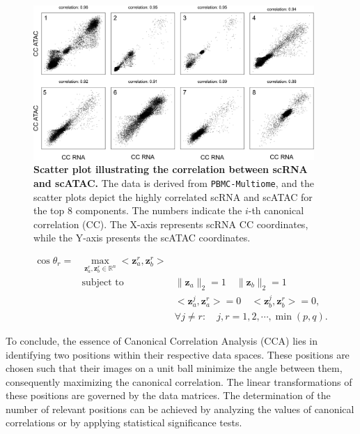 \begin{figure}[!ht]
	\centering
	\includegraphics[width=0.95\textwidth]{CC_corrlation_scatter/fig}
	\vspace{0.1cm}
	\caption[Scatter plot illustrating the correlation between scRNA and scATAC.]{\textbf{Scatter plot illustrating the correlation between scRNA and scATAC.} The data is derived from \texttt{PBMC-Multiome}, and the scatter plots depict the highly correlated scRNA and scATAC for the top 8 components. The numbers indicate the $i$-th canonical correlation (CC). The X-axis represents scRNA CC coordinates, while the Y-axis presents the scATAC coordinates.}
	\label{fig:CC_corrlation_scatter}
\end{figure}

\begin{equation}
\begin{aligned}
\cos \theta_r = &\underset{{\mathbf z}_a^r, {\mathbf z}_b^r \in\mathbb{R}^n}{\max}<{\mathbf z}_a^r, {\mathbf z}_b^r>\\
                &\text{subject to  } & \|{\mathbf z}_a\|_2=1\quad \|{\mathbf z}_b\|_2=1\\
				  & & <{\mathbf z}_a^j, {\mathbf z}_a^r>=0\quad <{\mathbf z}_b^j, {\mathbf z}_b^r>=0,\\
				  & & \forall j \neq r: \quad j,r = 1,2,\cdots,\min(p,q).
\end{aligned}
\end{equation}

 To conclude, the essence of Canonical Correlation Analysis (CCA) lies in identifying two positions within their respective data spaces. These positions are chosen such that their images on a unit ball minimize the angle between them, consequently maximizing the canonical correlation. The linear transformations of these positions are governed by the data matrices. The determination of the number of relevant positions can be achieved by analyzing the values of canonical correlations or by applying statistical significance tests.

